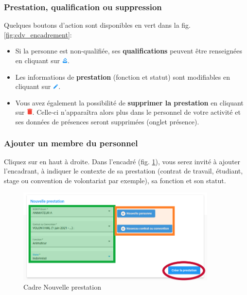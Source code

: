 \subsubsection{Prestation, qualification ou suppression}
Quelques boutons d'action sont disponibles en \textcolor{vert}{vert} dans la fig. \ref{fig:cdv_encadrement}:

\begin{itemize}
    \item Si la personne est non-qualifiée, ses \textbf{qualifications} peuvent être renseignées en cliquant sur \includegraphics[width=0.3cm]{Images/icon/button_dmd_qualif.png}.
    \item Les informations de \textbf{prestation} (fonction et statut) sont modifiables en cliquant sur \includegraphics[width=0.3cm]{Images/icon/button_modif.png}.
    \item Vous avez également la possibilité de \textbf{supprimer la prestation} en cliquant sur \includegraphics[width=0.3cm]{Images/icon/icon-del.png}. Celle-ci n'apparaîtra alors plus dans le personnel de votre activité et ses données de présences seront supprimées (onglet présence).
\end{itemize} 


\subsubsection{Ajouter un membre du personnel}
Cliquez sur  en haut à droite. Dans l'encadré  (fig. \ref{fig:cdv_new_prestation}), vous serez invité à ajouter l'encadrant, à indiquer le contexte de sa prestation (contrat de travail, étudiant, stage ou convention de volontariat par exemple), sa fonction et son statut. 

\begin{figure}
    \centering
    \includegraphics[width=10cm]{Images/cdv/new_prestation.png}
    \caption{Cadre Nouvelle prestation}
    \label{fig:cdv_new_prestation}
\end{figure}


